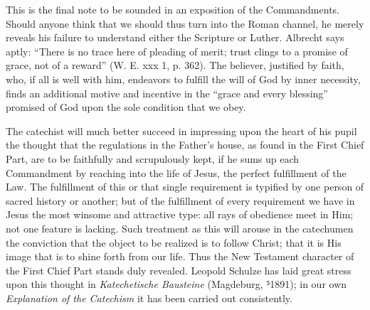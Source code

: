 This is the final note to be sounded in an exposition of the Commandments. Should anyone think that we should thus turn into the Roman channel, he merely reveals his failure to understand either the Scripture or Luther. Albrecht says aptly: “There is no trace here of pleading of merit; trust clings to a promise of grace, not of a reward” (W. E. xxx 1, p. 362). The believer, justified by faith, who, if all is well with him, endeavors to fulfill the will of God by inner necessity, finds an additional motive and incentive in the “grace and every blessing” promised of God upon the sole condition that we obey.

The catechist will much better succeed in impressing upon the heart of his pupil the thought that the regulations in the Father’s house, as found in the First Chief Part, are to be faithfully and scrupulously kept, if he sums up each Commandment by reaching into the life of Jesus, the perfect fulfillment of the Law. The fulfillment of this or that single requirement is typified by one person of sacred history or another; but of the fulfillment of every requirement we have in Jesus the most winsome and attractive type: all rays of obedience meet in Him; not one feature is lacking. Such treatment as this will arouse in the catechumen the conviction that the object to be realized is to follow Christ; that it is His image that is to shine forth from our life. Thus the New Testament character of the First Chief Part stands duly revealed. Leopold Schulze has laid great stress upon this thought in \emph{Katechetische Bausteine} (Magdeburg, ⁵1891); in our own \emph{Explanation of the Catechism} it has been carried out consistently.

